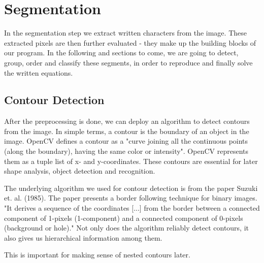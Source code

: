 \documentclass[12pt]{article}
\begin{document}
		
	
	
\section{Segmentation}
In the segmentation step we extract written characters from the image.
These extracted pixels are then further evaluated - they make up the building blocks of our program.
In the following and sections to come, we are going to detect, group, order and classify these segments, in order to
reproduce and finally solve the written equations.
	
	\subsection{Contour Detection}
	After the preprocessing is done, we can deploy an algorithm to detect contours from the image.
	In simple terms, a contour is the boundary of an object in the image.
	OpenCV defines a contour as a "curve joining all the continuous points (along the boundary), having the same color or intensity".
	OpenCV represents them as a tuple list of x- and y-coordinates.
	These contours are essential for later shape analysis, object detection and recognition.

	The underlying algorithm we used for contour detection is from the paper Suzuki et. al. (1985).
	The paper presents a border following technique for binary images. "It derives a sequence of the coordinates [...]
	from the border between a connected component of 1-pixels (1-component) and a connected component of 0-pixels (background or hole)."
	Not only does the algorithm reliably detect contours, it also gives us hierarchical information among them.
	
	This is important for making sense of nested contours later.
	
\end{document}
